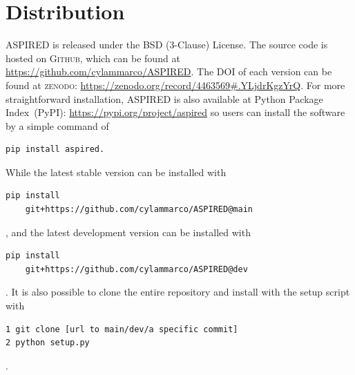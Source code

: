 \documentclass[fleqn,usenatbib]{mnras}
\begin{document}






\section{Distribution}
\textsc{ASPIRED} is released under the BSD (3-Clause) License. The
source code is hosted on \textsc{Github}, which can be found at
\url{https://github.com/cylammarco/ASPIRED}. The DOI of each version
can be found at \textsc{zenodo}: \url{https://zenodo.org/record/4463569#.YLjdrKgzYrQ}.
For more straightforward installation, \textsc{ASPIRED} is also available at Python
Package Index~(PyPI): \url{https://pypi.org/project/aspired} so
users can install the software by a simple command of 
\begin{verbatim}
pip install aspired.
\end{verbatim}
While the latest stable version can be installed with
\begin{verbatim}
pip install 
    git+https://github.com/cylammarco/ASPIRED@main
\end{verbatim},
and the latest development version can be installed with 
\begin{verbatim}
pip install 
    git+https://github.com/cylammarco/ASPIRED@dev
\end{verbatim}. It is also possible to clone the entire repository
and install with the setup script with
\begin{verbatim}
1 git clone [url to main/dev/a specific commit]
2 python setup.py
\end{verbatim}.
\end{document}
